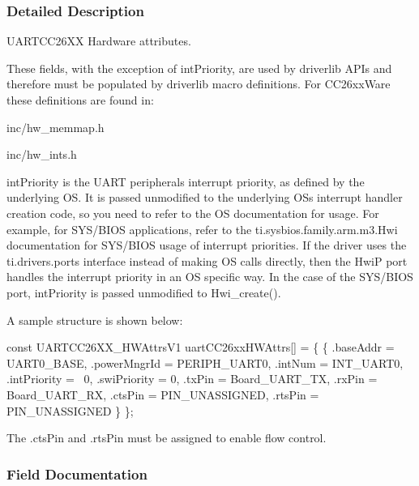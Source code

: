 \subsubsection{Detailed Description}
U\+A\+R\+T\+C\+C26\+X\+X Hardware attributes. 

These fields, with the exception of int\+Priority, are used by driverlib A\+P\+Is and therefore must be populated by driverlib macro definitions. For C\+C26xx\+Ware these definitions are found in\+:
\begin{DoxyItemize}
\item inc/hw\+\_\+memmap.\+h
\item inc/hw\+\_\+ints.\+h
\end{DoxyItemize}

int\+Priority is the U\+A\+R\+T peripheral\textquotesingle{}s interrupt priority, as defined by the underlying O\+S. It is passed unmodified to the underlying O\+S\textquotesingle{}s interrupt handler creation code, so you need to refer to the O\+S documentation for usage. For example, for S\+Y\+S/\+B\+I\+O\+S applications, refer to the ti.\+sysbios.\+family.\+arm.\+m3.\+Hwi documentation for S\+Y\+S/\+B\+I\+O\+S usage of interrupt priorities. If the driver uses the ti.\+drivers.\+ports interface instead of making O\+S calls directly, then the Hwi\+P port handles the interrupt priority in an O\+S specific way. In the case of the S\+Y\+S/\+B\+I\+O\+S port, int\+Priority is passed unmodified to Hwi\+\_\+create().

A sample structure is shown below\+: 
\begin{DoxyCode}
\textcolor{keyword}{const} UARTCC26XX_HWAttrsV1 uartCC26xxHWAttrs[] = \{
    \{
        .baseAddr    = UART0\_BASE,
        .powerMngrId = PERIPH\_UART0,
        .intNum      = INT\_UART0,
        .intPriority = ~0,
        .swiPriority = 0,
        .txPin       = Board\_UART\_TX,
        .rxPin       = Board\_UART\_RX,
        .ctsPin      = PIN_UNASSIGNED,
        .rtsPin      = PIN_UNASSIGNED
    \}
\};
\end{DoxyCode}


The .cts\+Pin and .rts\+Pin must be assigned to enable flow control. 

\subsubsection{Field Documentation}
